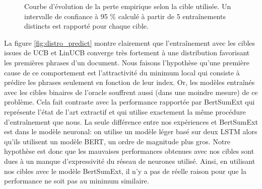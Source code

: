 \begin{figure}[h!]
\begin{center}
    \end{center}
    \caption{Courbe d'évolution de la perte empirique selon la cible utilisée.
             Un intervalle de confiance à 95 \% calculé à partir de 5 entraînements distincts
             est rapporté pour chaque cible.}
    \label{fig:loss_curve}
\end{figure}

La figure \ref{fig:distro_predict} montre clairement que l'entraînement
avec les cibles issues de UCB et LinUCB converge très fortement
à une distribution favorisant les premières phrases d'un document.
Nous faisons l'hypothèse qu'une première cause de ce comportement est l'attractivité 
du minimum local qui consiste à prédire les phrases seulement en fonction 
de leur index.
Or, les modèles entraînés avec les cibles binaires de l'oracle souffrent aussi
(dans une moindre mesure) de ce problème.
Cela fait contraste avec la performance rapportée par BertSumExt \citep{liu2019text}
qui représente l'état de l'art extractif et qui utilise exactement la même procédure 
d'entraînement que nous.
La seule différence entre nos expériences et BertSumExt est dans le modèle neuronal:
on utilise un modèle léger basé sur deux LSTM alors qu'ils utilisent un modèle BERT, 
un ordre de magnitude plus gros.
Notre hypothèse est donc que les mauvaises performances obtenues 
avec nos cibles sont dues à un manque d'expressivité du réseau de neurones utilisé.
Ainsi, en utilisant nos cibles avec le modèle BertSumExt, il n'y a pas de réelle 
raison pour que la performance ne soit pas au minimum similaire.

